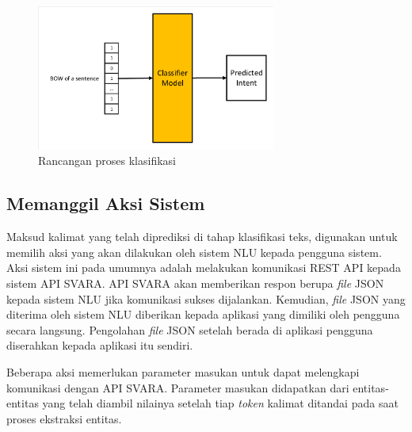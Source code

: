 \begin{figure}[H]
	\centering
	\includegraphics[width=0.7\textwidth, trim=2 2 2 2, clip]{resources/4-design_class_class.pdf}
	\caption{Rancangan proses klasifikasi}
	\label{fig:design_class_class}
\end{figure}

\subsection{Memanggil Aksi Sistem}

Maksud kalimat yang telah diprediksi di tahap klasifikasi teks, digunakan untuk memilih aksi yang akan dilakukan oleh sistem NLU kepada pengguna sistem. Aksi sistem ini pada umumnya adalah melakukan komunikasi REST API kepada sistem API SVARA. API SVARA akan memberikan respon berupa \textit{file} JSON kepada sistem NLU jika komunikasi sukses dijalankan. Kemudian, \textit{file} JSON yang diterima oleh sistem NLU diberikan kepada aplikasi yang dimiliki oleh pengguna secara langsung. Pengolahan \textit{file} JSON setelah berada di aplikasi pengguna diserahkan kepada aplikasi itu sendiri.

Beberapa aksi memerlukan parameter masukan untuk dapat melengkapi komunikasi dengan API SVARA. Parameter masukan didapatkan dari entitas-entitas yang telah diambil nilainya setelah tiap \textit{token} kalimat ditandai pada saat proses ekstraksi entitas.